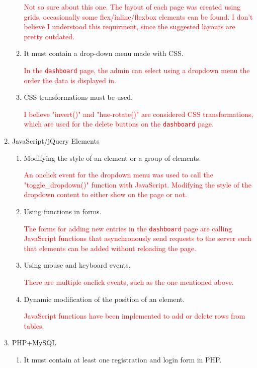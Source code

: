 \documentclass[a4paper]{article}
\begin{document}
\begin{enumerate}
\begin{enumerate}[label={$-$}]
            \textcolor{red}{Not so sure about this one. The layout of each page was created using grids, occasionally some flex/inline/flexbox elements can be found. I don't believe I understood this requirment, since the suggested layouts are pretty outdated.}
            \item It must contain a drop-down menu made with CSS.
            
            \textcolor{red}{In the \texttt{dashboard} page, the admin can select using a dropdown menu the order the data is displayed in.}
            \item CSS transformations must be used.

            \textcolor{red}{I believe "invert()" and "hue-rotate()" are considered CSS transformations, which are used for the delete buttons on the \texttt{dashboard} page.}
            \end{enumerate}
        \item JavaScript/jQuery Elements
            \begin{enumerate}[label={$-$}]
            \item Modifying the style of an element or a group of elements.

            \textcolor{red}{An onclick event for the dropdown menu was used to call the "toggle\_dropdown()" function with JavaScript. Modifying the style of the dropdown content to either show on the page or not.}
            \item Using functions in forms.

            \textcolor{red}{The forms for adding new entries in the \texttt{dashboard} page are calling JavaScript functions that asynchronously send requests to the server such that elements can be added without reloading the page.}
            \item Using mouse and keyboard events.

            \textcolor{red}{There are multiple onclick events, such as the one mentioned above.}
            \item Dynamic modification of the position of an element.

            \textcolor{red}{JavaScript functions have been implemented to add or delete rows from tables.}
            \end{enumerate}
        \item PHP+MySQL
            \begin{enumerate}[label={$-$}]
            \item It must contain at least one registration and login form in PHP.


\end{enumerate}
\end{enumerate}
\end{document}
